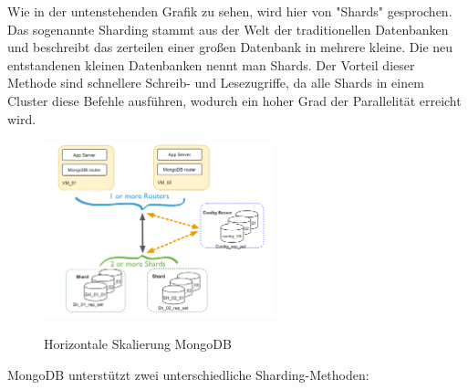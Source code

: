 Wie in der untenstehenden Grafik zu sehen, wird hier von "Shards" gesprochen. Das sogenannte Sharding stammt aus der Welt der traditionellen Datenbanken und beschreibt das zerteilen einer großen Datenbank in mehrere kleine. Die neu entstandenen kleinen Datenbanken nennt man Shards. Der Vorteil dieser Methode sind schnellere Schreib- und Lesezugriffe, da alle Shards in einem Cluster diese Befehle ausführen, wodurch ein hoher Grad der Parallelität erreicht wird.
\begin{figure}[h!]
    \centering
    \includegraphics[width=0.6\textwidth]{pics/vertical_scaling_mongodb.png}
    \caption{Horizontale Skalierung MongoDB}
    \cite{vertical_scaling_mongodb}
    \label{fig:enter-label}
\end{figure}
\newline
MongoDB unterstützt zwei unterschiedliche Sharding-Methoden:

